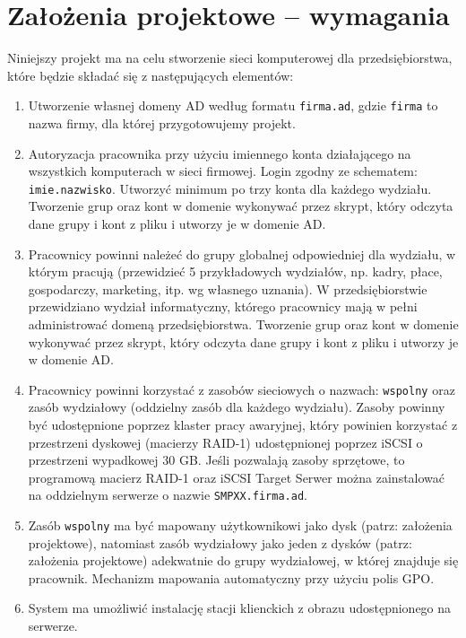 	\newpage
\section{Założenia projektowe – wymagania}		%



Niniejszy projekt ma na celu stworzenie sieci komputerowej dla przedsiębiorstwa, które będzie składać się z następujących elementów:
\begin{enumerate}
    \item Utworzenie własnej domeny AD według formatu \texttt{firma.ad}, gdzie \texttt{firma} to nazwa firmy, dla której przygotowujemy projekt.
    \item Autoryzacja pracownika przy użyciu imiennego konta działającego na wszystkich komputerach w sieci firmowej. Login zgodny ze schematem: \texttt{imie.nazwisko}. Utworzyć minimum po trzy konta dla każdego wydziału. Tworzenie grup oraz kont w domenie wykonywać przez skrypt, który odczyta dane grupy i kont z pliku i utworzy je w domenie AD.
    \item Pracownicy powinni należeć do grupy globalnej odpowiedniej dla wydziału, w którym pracują (przewidzieć 5 przykładowych wydziałów, np. kadry, płace, gospodarczy, marketing, itp. wg własnego uznania). W przedsiębiorstwie przewidziano wydział informatyczny, którego pracownicy mają w pełni administrować domeną przedsiębiorstwa. Tworzenie grup oraz kont w domenie wykonywać przez skrypt, który odczyta dane grupy i kont z pliku i utworzy je w domenie AD.
    \item Pracownicy powinni korzystać z zasobów sieciowych o nazwach: \texttt{wspolny} oraz zasób wydziałowy (oddzielny zasób dla każdego wydziału). Zasoby powinny być udostępnione poprzez klaster pracy awaryjnej, który powinien korzystać z przestrzeni dyskowej (macierzy RAID-1) udostępnionej poprzez iSCSI o przestrzeni wypadkowej 30 GB. Jeśli pozwalają zasoby sprzętowe, to programową macierz RAID-1 oraz iSCSI Target Serwer można zainstalować na oddzielnym serwerze o nazwie \texttt{SMPXX.firma.ad}.
    \item Zasób \texttt{wspolny} ma być mapowany użytkownikowi jako dysk (patrz: założenia projektowe), natomiast zasób wydziałowy jako jeden z dysków (patrz: założenia projektowe) adekwatnie do grupy wydziałowej, w której znajduje się pracownik. Mechanizm mapowania automatyczny przy użyciu polis GPO.
    \item System ma umożliwić instalację stacji klienckich z obrazu udostępnionego na serwerze.

\end{enumerate}
